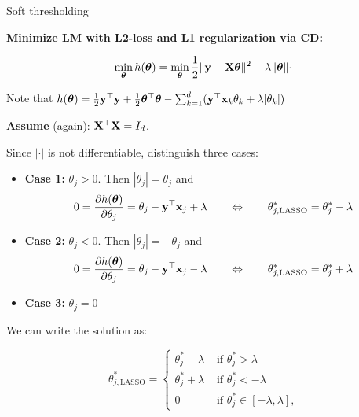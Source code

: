 \documentclass[11pt,compress,t,notes=noshow, xcolor=table]{beamer}
\begin{document}
\begin{vbframe}{Soft thresholding}

\textbf{Minimize LM with L2-loss and L1 regularization via CD:}

\begin{equation*}
    \min_{\thetav} h(\thetav) = \min_{\thetav} \frac{1}{2}\|\yv - \Xmat \thetav\|^2 + \lambda \|\thetav\|_1 %
\end{equation*}

Note that $h(\bm{\theta}) = \frac{1}{2}\mathbf{y}^\top \mathbf{y} + \frac{1}{2}\bm{\theta}^\top \bm{\theta}  - \sum_{k = 1}^d (\mathbf{y}^\top \mathbf{x}_k \theta_k + \lambda|\theta_k|)$

\medskip

\textbf{Assume} (again): $\mathbf{X}^\top \mathbf{X} = I_d$.

Since $|\cdot|$ is not differentiable, distinguish three cases:

\medskip

\begin{footnotesize}
    \begin{itemize}
        \item \textbf{Case 1:} $\theta_j > 0$.
            Then $|\theta_j| = \theta_j$ and 
            \begin{equation*}
                0 = \frac{\partial{h}(\bm{\theta})}{\partial \theta_j} = \theta_j - \mathbf{y}^\top \mathbf{x}_j + \lambda \qquad \Leftrightarrow \qquad \theta^\ast_{j, \text{LASSO}} = \theta^\ast_j - \lambda        
            \end{equation*}
        \item \textbf{Case 2:} $\theta_j < 0$.
            Then $|\theta_j| = - \theta_j$ and 
            \begin{equation*}
                0 = \frac{\partial{h}(\bm{\theta})}{\partial \theta_j} = \theta_j - \mathbf{y}^\top \mathbf{x}_j - \lambda \qquad \Leftrightarrow \qquad \theta^\ast_{j, \text{LASSO}} = \theta^\ast_j + \lambda
                \end{equation*}
        \item \textbf{Case 3:} $\theta_j = 0$
    \end{itemize}
\end{footnotesize}

We can write the solution as: 

\begin{equation*}
    \theta^\ast_{j, \text{LASSO}} =
    \begin{cases}
        \theta^\ast_j - \lambda & \text{ if } \theta^\ast_j > \lambda \\
        \theta^\ast_j + \lambda & \text{ if } \theta^\ast_j < - \lambda \\
        0 &  \text{ if }  \theta^\ast_j \in [- \lambda, \lambda],
    \end{cases}
\end{equation*}


\end{vbframe}
\end{document}
